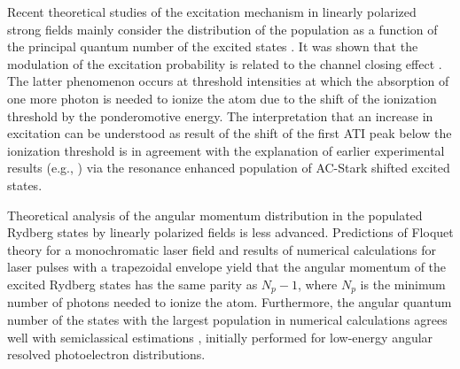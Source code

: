 Recent theoretical studies of the excitation mechanism in linearly polarized strong fields mainly consider the distribution of the population as a function of the principal quantum number of the excited states \cite{li2014,li2014b,zimmermann2017,xiong2017,piraux2017}. It was shown that the modulation of the excitation probability is related to the channel closing effect \cite{krajewska2012,li2014,li2014b,piraux2017}. The latter phenomenon occurs at threshold intensities at which the absorption of one more photon is needed to ionize the atom due to the shift of the ionization threshold by the ponderomotive energy. The interpretation that an increase in excitation can be understood as result of the shift of the first ATI peak below the ionization threshold \cite{li2014,li2014b} is in agreement with the explanation of earlier experimental results (e.g., \cite{freeman1987,jones1992,rottke1994}) via the resonance enhanced population of AC-Stark shifted excited states. 

Theoretical analysis of the angular momentum distribution in the populated Rydberg states by linearly polarized fields is less advanced. Predictions of Floquet theory for a monochromatic laser field \cite{krajewska2012} and results of numerical calculations for laser pulses with a trapezoidal envelope \cite{piraux2017} yield that the angular momentum of the excited Rydberg states has the same parity as $N_p-1$, where $N_p$ is the minimum number of photons needed to ionize the atom. Furthermore, the angular quantum number of the states with the largest population in numerical calculations \cite{li2014,li2014b,piraux2017} agrees well with semiclassical estimations \cite{arbo2008}, initially performed for low-energy angular resolved photoelectron distributions.

